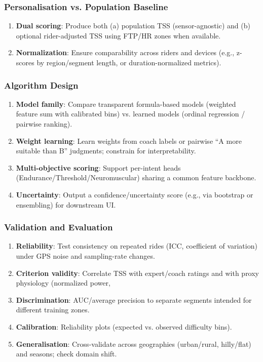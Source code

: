 \documentclass[11pt,twoside]{report}
\begin{document}
\subsubsection{Personalisation vs. Population Baseline}
\begin{enumerate}
	\item \textbf{Dual scoring}: Produce both (a) population TSS (sensor-agnostic) and (b) optional rider-adjusted TSS using FTP/HR zones when available.
	\item \textbf{Normalization}: Ensure comparability across riders and devices (e.g., z-scores by region/segment length, or duration-normalized metrics).
\end{enumerate}

\subsubsection{Algorithm Design}
\begin{enumerate}
	\item \textbf{Model family}: Compare transparent formula-based models (weighted feature sum with calibrated bins) vs. learned models (ordinal regression / pairwise ranking).
	\item \textbf{Weight learning}: Learn weights from coach labels or pairwise “A more suitable than B” judgments; constrain for interpretability.
	\item \textbf{Multi-objective scoring}: Support per-intent heads (Endurance/Threshold/Neuromuscular) sharing a common feature backbone.
	\item \textbf{Uncertainty}: Output a confidence/uncertainty score (e.g., via bootstrap or ensembling) for downstream UI.
\end{enumerate}

\subsubsection{Validation and Evaluation}
\begin{enumerate}
	\item \textbf{Reliability}: Test consistency on repeated rides (ICC, coefficient of variation) under GPS noise and sampling-rate changes.
	\item \textbf{Criterion validity}: Correlate TSS with expert/coach ratings and with proxy physiology (normalized power, %
	\item \textbf{Discrimination}: AUC/average precision to separate segments intended for different training zones.
	\item \textbf{Calibration}: Reliability plots (expected vs. observed difficulty bins).
	\item \textbf{Generalisation}: Cross-validate across geographies (urban/rural, hilly/flat) and seasons; check domain shift.
\end{enumerate}
\end{document}
